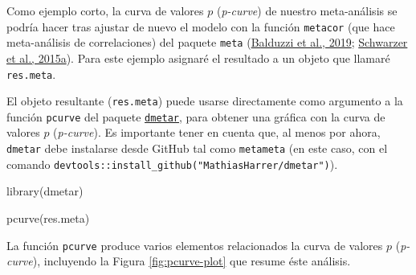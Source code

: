 \documentclass[
  bookmarksnumbered]{article}
\newenvironment{Shaded}{\begin{snugshade}}{\end{snugshade}}
\newcommand{\AttributeTok}[1]{\textcolor[rgb]{0.00,0.34,0.68}{#1}}
\newcommand{\FunctionTok}[1]{\textcolor[rgb]{0.39,0.29,0.61}{#1}}
\newcommand{\NormalTok}[1]{\textcolor[rgb]{0.12,0.11,0.11}{#1}}
\newcommand{\OtherTok}[1]{\textcolor[rgb]{0.00,0.43,0.16}{#1}}
\newcommand{\SpecialCharTok}[1]{\textcolor[rgb]{0.24,0.68,0.91}{#1}}
\newcommand{\StringTok}[1]{\textcolor[rgb]{0.75,0.01,0.01}{#1}}
\begin{document}
Como ejemplo corto, la curva de valores \(p\) (\emph{p-curve}) de nuestro meta-análisis se podría hacer tras ajustar de nuevo el modelo con la función \texttt{metacor} (que hace meta-análisis de correlaciones) del paquete \texttt{meta} (\protect\hyperlink{ref-BalduzziMeta2019}{Balduzzi et al., 2019}; \protect\hyperlink{ref-schwarzerMetaAnalysis2015}{Schwarzer et al., 2015a}). Para este ejemplo asignaré el resultado a un objeto que llamaré \texttt{res.meta}.

\begin{Shaded}
\end{Shaded}

El objeto resultante (\texttt{res.meta}) puede usarse directamente como argumento a la función \texttt{pcurve} del paquete \href{http://dmetar.protectlab.org/}{\texttt{dmetar}}, para obtener una gráfica con la curva de valores \(p\) (\emph{p-curve}). Es importante tener en cuenta que, al menos por ahora, \texttt{dmetar} debe instalarse desde GitHub tal como \texttt{metameta} (en este caso, con el comando \texttt{devtools::install\_github("MathiasHarrer/dmetar")}).

\begin{Shaded}
\begin{Highlighting}[]
\FunctionTok{library}\NormalTok{(dmetar)}

\FunctionTok{pcurve}\NormalTok{(res.meta)}
\end{Highlighting}
\end{Shaded}

La función \texttt{pcurve} produce varios elementos relacionados la curva de valores \(p\) (\emph{p-curve}), incluyendo la Figura \ref{fig:pcurve-plot} que resume éste análisis.
\end{document}
